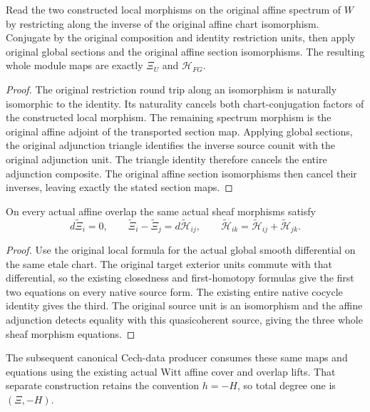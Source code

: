 \begin{theorem}
\label{thm:actual-witt-geometric-xi-homotopy-readback}
\leanok
Read the two constructed local morphisms on the original affine spectrum of $W$ by restricting along the inverse of the original affine chart isomorphism. Conjugate by the original composition and identity restriction units, then apply original global sections and the original affine section isomorphisms. The resulting whole module maps are exactly $\Xi_U$ and $\mathcal H_{FG}$.
\end{theorem}
\begin{proof}
The original restriction round trip along an isomorphism is naturally isomorphic to the identity. Its naturality cancels both chart-conjugation factors of the constructed local morphism. The remaining spectrum morphism is the original affine adjoint of the transported section map. Applying global sections, the original adjunction triangle identifies the inverse source counit with the original adjunction unit. The triangle identity therefore cancels the entire adjunction composite. The original affine section isomorphisms then cancel their inverses, leaving exactly the stated section maps.
\end{proof}

\begin{theorem}
\label{thm:actual-witt-geometric-xi-homotopy-equations}
\leanok
On every actual affine overlap the same actual sheaf morphisms satisfy
\[
 d\widetilde\Xi_i=0,\qquad
 \widetilde\Xi_i-\widetilde\Xi_j=d\widetilde{\mathcal H}_{ij},\qquad
 \widetilde{\mathcal H}_{ik}=\widetilde{\mathcal H}_{ij}+\widetilde{\mathcal H}_{jk}.
\]
\end{theorem}
\begin{proof}
Use the original local formula for the actual global smooth differential on the same etale chart. The original target exterior units commute with that differential, so the existing closedness and first-homotopy formulas give the first two equations on every native source form. The existing entire native cocycle identity gives the third. The original source unit is an isomorphism and the affine adjunction detects equality with this quasicoherent source, giving the three whole sheaf morphism equations.
\end{proof}

The subsequent canonical Cech-data producer consumes these same maps and equations using the existing actual Witt affine cover and overlap lifts. That separate construction retains the convention $h=-H$, so total degree one is $(\Xi,-H)$.
